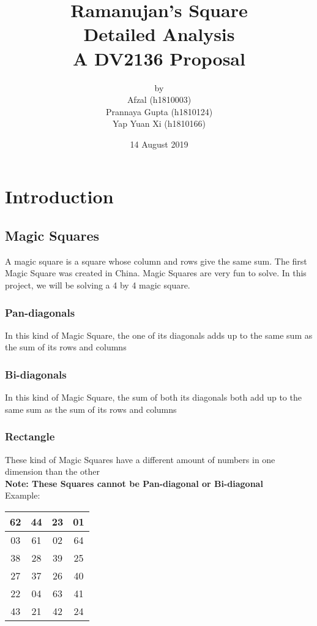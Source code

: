 \documentclass{article}
\title{%
  \Huge Ramanujan's Square \\
  \LARGE Detailed Analysis\\
  \Large A DV2136 Proposal}
\author{by\\
\Large Afzal (h1810003) \\
\Large Prannaya Gupta (h1810124) \\
\Large Yap Yuan Xi (h1810166) \\
}
\date{\Large 14 August 2019}
\begin{document}
\maketitle

\section{Introduction}

\subsection{Magic Squares}
    A magic square is a square whose column and rows give the same sum. The first Magic Square was created in China. Magic Squares are very fun to solve. In this project, we will be solving a 4 by 4 magic square.
    \subsubsection{Pan-diagonals}
            In this kind of Magic Square, the one of its diagonals adds up to the same sum as the sum of its rows and columns
    \subsubsection{Bi-diagonals}
        In this kind of Magic Square, the sum of both its diagonals both add up to the same sum as the sum of its rows and columns
    \subsubsection{Rectangle}
        These kind of Magic Squares have a different amount of numbers in one dimension than the other\\
        \textbf{Note: These Squares cannot be Pan-diagonal or Bi-diagonal}\\
        Example:
        \def\arraystretch{2}
        \begin{center}
            \begin{tabular}{|c|c|c|c|}
                \hline
                62 & 44 & 23 & 01 \\
                \hline
                03 & 61 & 02 & 64 \\
                \hline
                38 & 28 & 39 & 25 \\
                \hline
                27 & 37 & 26 & 40 \\
                \hline
                22 & 04 & 63 & 41 \\                    
                \hline
                43 & 21 & 42 & 24 \\
                \hline
            \end{tabular}
        \end{center}
\end{document}
